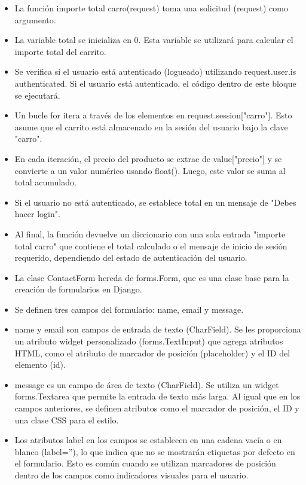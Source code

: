 
\begin{itemize}
        \item La función importe total carro(request) toma una solicitud (request) como argumento.
        \item La variable total se inicializa en 0. Esta variable se utilizará para calcular el importe total del carrito.
        \item Se verifica si el usuario está autenticado (logueado) utilizando request.user.is authenticated. Si el usuario está autenticado, el código dentro de este bloque se ejecutará.
        \item Un bucle for itera a través de los elementos en request.session["carro"]. Esto asume que el carrito está almacenado en la sesión del usuario bajo la clave "carro".
        \item En cada iteración, el precio del producto se extrae de value["precio"] y se convierte a un valor numérico usando float(). Luego, este valor se suma al total acumulado.
        \item Si el usuario no está autenticado, se establece total en un mensaje de "Debes hacer login".
        \item Al final, la función devuelve un diccionario con una sola entrada "importe total carro" que contiene el total calculado o el mensaje de inicio de sesión requerido, dependiendo del estado de autenticación del usuario.
\end{itemize}

\begin{itemize}
        \item La clase ContactForm hereda de forms.Form, que es una clase base para la creación de formularios en Django.
        \item Se definen tres campos del formulario: name, email y message.
        \item name y email son campos de entrada de texto (CharField). Se les proporciona un atributo widget personalizado (forms.TextInput) que agrega atributos HTML, como el atributo de marcador de posición (placeholder) y el ID del elemento (id).
        \item message es un campo de área de texto (CharField). Se utiliza un widget forms.Textarea que permite la entrada de texto más larga. Al igual que en los campos anteriores, se definen atributos como el marcador de posición, el ID y una clase CSS para el estilo.
        \item Los atributos label en los campos se establecen en una cadena vacía o en blanco (label=''), lo que indica que no se mostrarán etiquetas por defecto en el formulario. Esto es común cuando se utilizan marcadores de posición dentro de los campos como indicadores visuales para el usuario.
\end{itemize}
